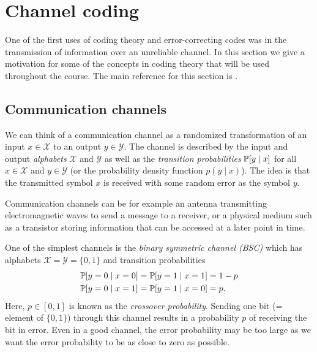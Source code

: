 \documentclass[../main.tex]{subfiles}
\begin{document}
\section{Channel coding}

One of the first uses of coding theory and error-correcting codes was in the transmission of information over an unreliable channel. In this section we give a motivation for some of the concepts in coding theory that will be used throughout the course. The main reference for this section is \cite[Chapter 2]{ling2004coding}.

\subsection{Communication channels}

We can think of a communication channel as a randomized transformation of an input $x \in \mathcal{X}$ to an output $y \in \mathcal{Y}$. The channel is described by the input and output \emph{alphabets} $\mathcal{X}$ and $\mathcal{Y}$ as well as the \emph{transition probabilities} $\P[y \mid x]$ for all $x \in \mathcal{X}$ and $y \in \mathcal{Y}$ (or the probability density function $p(y \mid x)$). The idea is that the transmitted symbol $x$ is received with some random error as the symbol $y$.

Communication channels can be for example an antenna transmitting electromagnetic waves to send a message to a receiver, or a physical medium such as a transistor storing information that can be accessed at a later point in time.

\begin{example}
One of the simplest channels is the \emph{binary symmetric channel (BSC)} which has alphabets $\mathcal{X} = \mathcal{Y} = \{0, 1\}$ and transition probabilities
\begin{align*}
    \P[y = 0 \mid x = 0] = \P[y = 1 \mid x = 1] &= 1 - p \\
    \P[y = 0 \mid x = 1] = \P[y = 1 \mid x = 0] &= p.
\end{align*}
Here, $p \in [0, 1]$ is known as the \emph{crossover probability}. Sending one bit (= element of $\{0, 1\}$) through this channel results in a probability $p$ of receiving the bit in error. Even in a good channel, the error probability may be too large as we want the error probability to be as close to zero as possible.
\end{example}
\end{document}
